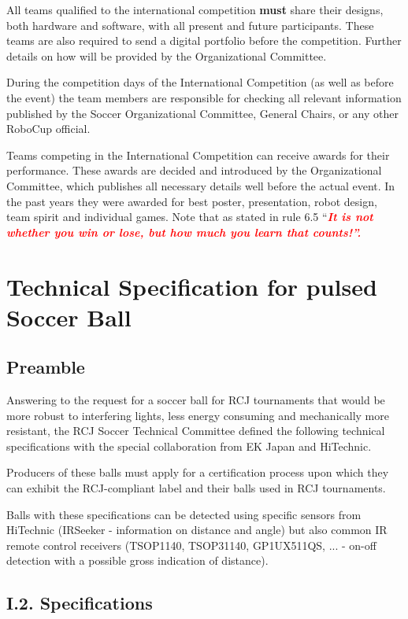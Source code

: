 \documentclass{article}
\begin{document}
All teams qualified to the international competition \textbf{must} share their
designs, both hardware and software, with all present and future participants.
These teams are also required to send a digital portfolio before the
competition. Further details on how will be provided by the Organizational
Committee.

During the competition days of the International Competition (as well as before
the event) the team members are responsible for checking all relevant
information published by the Soccer Organizational Committee, General Chairs,
or any other RoboCup official.

Teams competing in the International Competition can receive awards for their
performance. These awards are decided and introduced by the Organizational
Committee, which publishes all necessary details well before the actual event.
In the past years they were awarded for best poster, presentation, robot
design, team spirit and individual games. Note that as stated in rule 6.5
``\textbf{\textit{\textcolor{red}{It is not whether you win or lose, but how
much you learn that counts!''.}}}

\appendix
\section{Technical Specification for pulsed Soccer Ball\label{ref-pulsed-spec}}

\subsection{Preamble}

Answering to the request for a soccer ball for RCJ tournaments that would be
more robust to interfering lights, less energy consuming and mechanically more
resistant, the RCJ Soccer Technical Committee defined the following technical
specifications with the special collaboration from EK Japan and HiTechnic.

Producers of these balls must apply for a certification process upon which they
can exhibit the RCJ-compliant label and their balls used in RCJ tournaments.

Balls with these specifications can be detected using specific sensors from
HiTechnic (IRSeeker - information on distance and angle) but also common IR
remote control receivers (TSOP1140, TSOP31140, GP1UX511QS, ... - on-off
detection with a possible gross indication of distance).

\subsection{I.2. Specifications}
\end{document}

